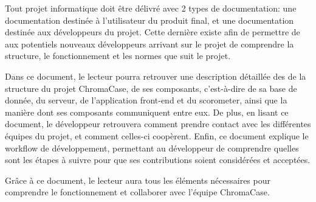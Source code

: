 Tout projet informatique doit être délivré avec 2 types de documentation: une documentation destinée à l’utilisateur du produit final, et une documentation destinée aux développeurs du projet. Cette dernière existe afin de permettre de aux potentiels nouveaux développeurs arrivant sur le projet de comprendre la structure, le fonctionnement et les normes que suit le projet.

Dans ce document, le lecteur pourra retrouver une description détaillée des de la structure du projet ChromaCase, de ses composants, c’est-à-dire de sa base de donnée, du serveur, de l’application front-end et du scorometer, ainsi que la manière dont ses composants communiquent entre eux. De plus, en lisant ce document, le développeur retrouvera comment prendre contact avec les différentes équipes du projet, et comment celles-ci coopèrent. Enfin, ce document explique le workflow de développement, permettant au développeur de comprendre quelles sont les étapes à suivre pour que ses contributions soient considérées et acceptées.

Grâce à ce document, le lecteur aura tous les éléments nécessaires pour comprendre le fonctionnement et collaborer avec l’équipe ChromaCase.
